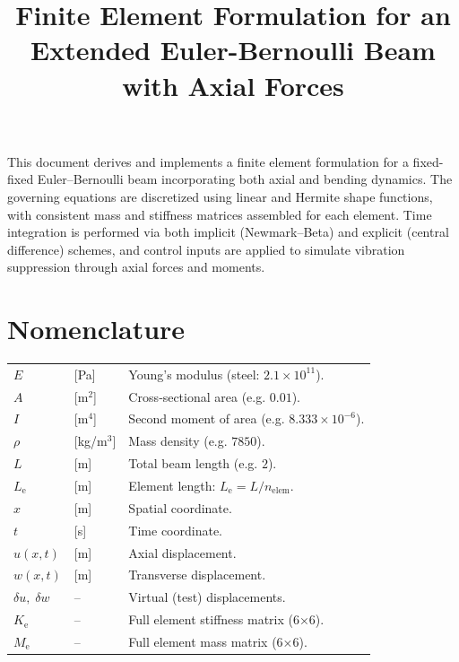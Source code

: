 \documentclass{article}
\newcommand{\bl}[1]{\textcolor[rgb]{0.00,0.00,1.00}{#1}}
\begin{document}
	
	\title{Finite Element Formulation for an Extended Euler-Bernoulli Beam with Axial Forces}
	\author{}
	\date{}
	\maketitle
	
	This document derives and implements a finite element formulation for a fixed-fixed Euler–Bernoulli beam incorporating both axial and bending dynamics. The governing equations are discretized using linear and Hermite shape functions, with consistent mass and stiffness matrices assembled for each element. Time integration is performed via both implicit (Newmark–Beta) and explicit (central difference) schemes, and control inputs are applied to simulate vibration suppression through axial forces and moments.
	
	\section{Nomenclature}
	\bl{\begin{tabular}{@{}p{2cm}@{} p{2cm}@{} p{11cm}@{}}
		$E$           & [Pa]    & Young’s modulus (steel: $2.1\times10^{11}$).\\
		$A$           & [m$^2$] & Cross‐sectional area (e.g. $0.01$).\\
		$I$           & [m$^4$] & Second moment of area (e.g. $8.333\times10^{-6}$).\\
		$\rho$        & [kg/m$^3$]& Mass density (e.g. $7850$).\\
		$L$           & [m]     & Total beam length (e.g. $2$).\\
		$L_\mathrm{e}$         & [m]     & Element length: $L_\mathrm{e}=L/n_{\mathrm{elem}}$.\\
		$x$           & [m]     & Spatial coordinate.\\
		$t$           & [s]     & Time coordinate.\\
		$u(x,t)$      & [m]     & Axial displacement.\\
		$w(x,t)$      & [m]     & Transverse displacement.\\
		$\delta u,\;\delta w$ & – & Virtual (test) displacements.\\
		$K_\mathrm{e}$         & –       & Full element stiffness matrix (6×6).\\
		$M_\mathrm{e}$         & –       & Full element mass matrix (6×6).\\
	\end{tabular}}
	
\end{document}
